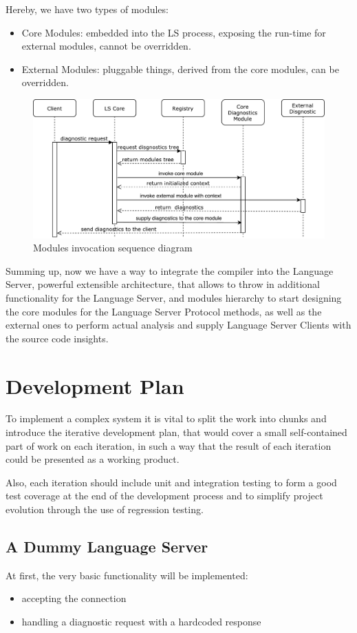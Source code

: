 Hereby, we have two types of modules:
\begin{itemize}
    \item Core Modules: embedded into the LS process, exposing the run-time for external modules, cannot be overridden.
    \item External Modules: pluggable things, derived from the core modules, can be overridden.
\end{itemize}

\begin{figure}[H]
    \centering
    \includegraphics[width=1.0\textwidth]{figs/modules_sd.pdf}
    \caption{Modules invocation sequence diagram}
\end{figure}

Summing up, now we have a way to integrate the compiler into the Language Server, powerful extensible architecture,
that allows to throw in additional functionality for the Language Server, 
and modules hierarchy to start designing the core modules for the Language Server Protocol methods, as well as
the external ones to perform actual analysis and supply Language Server Clients with the source code insights.

\section{Development Plan}
To implement a complex system it is vital to split the work into chunks and introduce
the iterative development plan, that would cover a small self-contained part of work on each iteration,
in such a way that the result of each iteration could be presented as a working product.

Also, each iteration should include unit and integration testing to form a good test coverage
at the end of the development process and to simplify project evolution through the use of regression testing.

\subsection{A Dummy Language Server}
At first, the very basic functionality will be implemented: 
\begin{itemize}
    \item accepting the connection
    \item handling a diagnostic request with a hardcoded response
\end{itemize}

